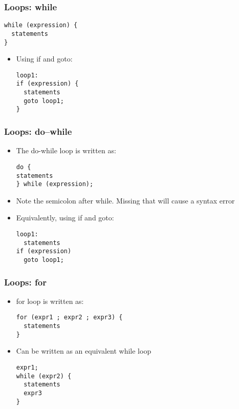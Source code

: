 \documentclass[11pt]{beamer}
\begin{document}
\begin{frame}[fragile]\frametitle{Loops: while}
\label{sec-1-15}


\begin{verbatim}
while (expression) { 
  statements
}
\end{verbatim}
\begin{itemize}
\item Using if and goto:

\begin{verbatim}
loop1:
if (expression) {
  statements
  goto loop1;
}
\end{verbatim}
\end{itemize}
\end{frame}
\begin{frame}[fragile]\frametitle{Loops: do--while}
\label{sec-1-16}

\begin{itemize}
\item The do-while loop is written as:

\begin{verbatim}
do {
statements
} while (expression);
\end{verbatim}
\item Note the semicolon after while. Missing that will cause a syntax error
\item Equivalently, using if and goto:

\begin{verbatim}
loop1:
  statements
if (expression)
  goto loop1;
\end{verbatim}
\end{itemize}
\end{frame}
\begin{frame}[fragile]\frametitle{Loops: for}
\label{sec-1-17}

\begin{itemize}
\item for loop is written as:

\begin{verbatim}
for (expr1 ; expr2 ; expr3) {
  statements
}
\end{verbatim}
\item Can be written as an equivalent while loop

\begin{verbatim}
expr1;
while (expr2) {
  statements
  expr3
}
\end{verbatim}
\end{itemize}
\end{frame}
\end{document}
